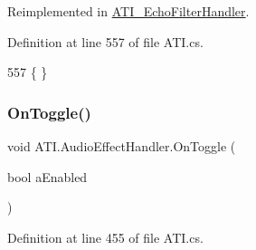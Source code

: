 Reimplemented in \hyperlink{class_a_t_i___echo_filter_handler_ab64eed11cb12db663a9485bc4bc26fb9}{A\+T\+I\+\_\+\+Echo\+Filter\+Handler}.



Definition at line 557 of file A\+T\+I.\+cs.


\begin{DoxyCode}
557 \{ \}
\end{DoxyCode}
\mbox{\label{class_a_t_i_1_1_audio_effect_handler_aa698c6c69066c8e3f2caa9beeea51569}} 
\subsubsection{\texorpdfstring{On\+Toggle()}{OnToggle()}}
{\footnotesize\ttfamily void A\+T\+I.\+Audio\+Effect\+Handler.\+On\+Toggle (\begin{DoxyParamCaption}\item[{bool}]{a\+Enabled }\end{DoxyParamCaption})}



Definition at line 455 of file A\+T\+I.\+cs.


